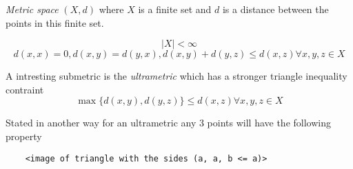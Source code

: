 \emph{Metric space}
$(X, d)$ where $X$ is a finite set and $d$ is a distance between
the points in this finite set.

\begin{equation}
    |X|<\infty
\end{equation}
\begin{equation}
    d(x, x) = 0,
    d(x, y) = d(y, x),
    d(x, y) + d(y, z) \le d(x, z) \forall x, y, z \in X
\end{equation}

A intresting submetric is the \emph{ultrametric} which has a stronger triangle
inequality contraint
\begin{equation}
    \max\{d(x, y), d(y, z)\} \le d(x, z) \forall x, y, z \in X
\end{equation}

Stated in another way for an ultrametric any 3 points
will have the following property

\begin{verbatim}
    <image of triangle with the sides (a, a, b <= a)>
\end{verbatim}






